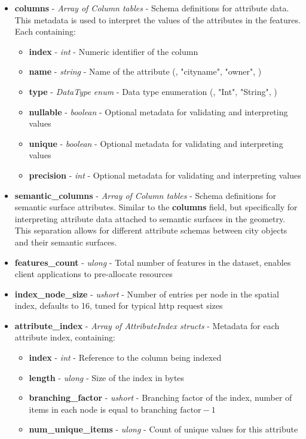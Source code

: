 \begin{itemize}
  \item \textbf{columns} - \textit{Array of Column tables} - Schema definitions for attribute data. This metadata is used to interpret the values of the attributes in the features. Each containing:
    \begin{itemize}
      \item \textbf{index} - \textit{int} - Numeric identifier of the column
      \item \textbf{name} - \textit{string} - Name of the attribute (\eg, "cityname", "owner", \etc)
      \item \textbf{type} - \textit{DataType enum} - Data type enumeration (\eg, "Int", "String", \etc)
      \item \textbf{nullable} - \textit{boolean} - Optional metadata for validating and interpreting values
      \item \textbf{unique} - \textit{boolean} - Optional metadata for validating and interpreting values
      \item \textbf{precision} - \textit{int} - Optional metadata for validating and interpreting values
    \end{itemize}

  \item \textbf{semantic\_columns} - \textit{Array of Column tables} - Schema definitions for semantic surface attributes. Similar to the \textbf{columns} field, but specifically for interpreting attribute data attached to semantic surfaces in the geometry. This separation allows for different attribute schemas between city objects and their semantic surfaces.

  \item \textbf{features\_count} - \textit{ulong} - Total number of features in the dataset, enables client applications to pre-allocate resources

  \item \textbf{index\_node\_size} - \textit{ushort} - Number of entries per node in the spatial index, defaults to 16, tuned for typical \ac{http} request sizes

  \item \textbf{attribute\_index} - \textit{Array of AttributeIndex structs} - Metadata for each attribute index, containing:
    \begin{itemize}
      \item \textbf{index} - \textit{int} - Reference to the column being indexed
      \item \textbf{length} - \textit{ulong} - Size of the index in bytes
      \item \textbf{branching\_factor} - \textit{ushort} - Branching factor of the index, number of items in each node is equal to $\text{branching factor} - 1$
      \item \textbf{num\_unique\_items} - \textit{ulong} - Count of unique values for this attribute
    \end{itemize}
\end{itemize}

